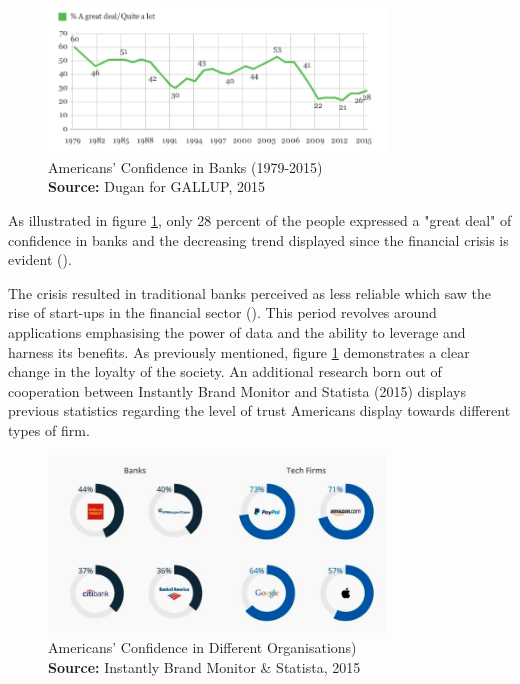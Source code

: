 \documentclass[11pt,a4paper]{article}
\newcommand*{\captionsource}[2]{%
  \caption[{#1}]{%
    #1%
    \\\hspace{\linewidth}%
    \textbf{Source:} #2%
  }%
}
\begin{document}

\newpage
  \vspace{5mm}
\begin{figure}[H]
	\centering
  \includegraphics[width=90mm]{figures/fig1_america_survey_trust_banks}
  \vspace{5mm}
    \captionsetup{justification=centering,margin=2cm}
      \captionsource{Americans' Confidence in Banks (1979-2015)}{Dugan for GALLUP, 2015}
	\label{fig:bank_trust_survey}
\end{figure}

As illustrated in figure \ref{fig:bank_trust_survey}, only 28 percent of the people expressed a "great deal" of confidence in banks and the decreasing trend displayed since the financial crisis is evident (\cite{andrewConfidenceBanksLow2015}). \par  
The crisis resulted in traditional banks perceived as less reliable which saw the rise of start-ups in the financial sector (\cite{arner150YearsFintech2016}). This period revolves around applications emphasising the power of data and the ability to leverage and harness its benefits. As previously mentioned, figure \ref{fig:bank_trust_survey}  demonstrates a clear change in the loyalty of the society. An additional research born out of cooperation between Instantly Brand Monitor and Statista (2015) displays previous statistics regarding the level of trust Americans display towards different types of firm. 

  \vspace{5mm}
\begin{figure}[H]
	\centering
  \includegraphics[width=0.8\textwidth, scale=0.1]{figures/fig2_breakdown_american_survey}
  \vspace{5mm}
    \captionsetup{justification=centering,margin=2cm}
      \captionsource{Americans' Confidence in Different Organisations)}{Instantly Brand Monitor \& Statista, 2015}
	\label{fig:org_trust_breakdown}
\end{figure}
\end{document}
